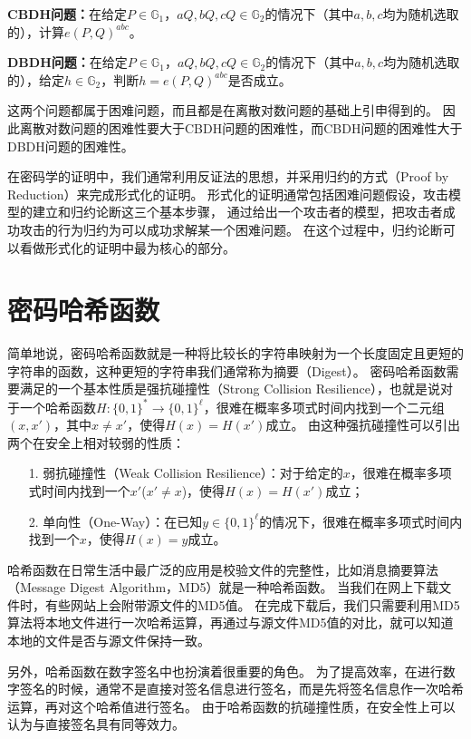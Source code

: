 \textbf{CBDH问题：}在给定$P\in\mathbb{G}_1$，$aQ,bQ,cQ\in\mathbb{G}_2$的情况下（其中$a,b,c$均为随机选取的），计算$e(P,Q)^{abc}$。

\textbf{DBDH问题：}在给定$P\in\mathbb{G}_1$，$aQ,bQ,cQ\in\mathbb{G}_2$的情况下（其中$a,b,c$均为随机选取的），给定$h\in\mathbb{G}_2$，判断$h=e(P,Q)^{abc}$是否成立。

这两个问题都属于困难问题，而且都是在离散对数问题的基础上引申得到的。
因此离散对数问题的困难性要大于CBDH问题的困难性，而CBDH问题的困难性大于DBDH问题的困难性。

在密码学的证明中，我们通常利用反证法的思想，并采用归约的方式（Proof by Reduction）来完成形式化的证明。
形式化的证明通常包括困难问题假设，攻击模型的建立和归约论断这三个基本步骤，
通过给出一个攻击者的模型，把攻击者成功攻击的行为归约为可以成功求解某一个困难问题。
在这个过程中，归约论断可以看做形式化的证明中最为核心的部分。

\section{密码哈希函数}

简单地说，密码哈希函数就是一种将比较长的字符串映射为一个长度固定且更短的字符串的函数，这种更短的字符串我们通常称为摘要（Digest）。
密码哈希函数需要满足的一个基本性质是强抗碰撞性（Strong Collision Resilience），也就是说对于一个哈希函数$H:\{0,1\}^*\rightarrow \{0,1\}^\ell$，很难在概率多项式时间内找到一个二元组$(x,x')$，其中$x\neq x'$，使得$H(x)=H(x')$成立。
由这种强抗碰撞性可以引出两个在安全上相对较弱的性质：

\begin{itemize}
  \item[1.] 弱抗碰撞性（Weak Collision Resilience）：对于给定的$x$，很难在概率多项式时间内找到一个$x'$($x'\neq x$)，使得$H(x)=H(x')$成立；
  \item[2.] 单向性（One-Way）：在已知$y\in \{0,1\}^\ell$的情况下，很难在概率多项式时间内找到一个$x$，使得$H(x)=y$成立。
\end{itemize}

哈希函数在日常生活中最广泛的应用是校验文件的完整性，比如消息摘要算法（Message Digest Algorithm，MD5）就是一种哈希函数。
当我们在网上下载文件时，有些网站上会附带源文件的MD5值。
在完成下载后，我们只需要利用MD5算法将本地文件进行一次哈希运算，再通过与源文件MD5值的对比，就可以知道本地的文件是否与源文件保持一致。

另外，哈希函数在数字签名中也扮演着很重要的角色。
为了提高效率，在进行数字签名的时候，通常不是直接对签名信息进行签名，而是先将签名信息作一次哈希运算，再对这个哈希值进行签名。
由于哈希函数的抗碰撞性质，在安全性上可以认为与直接签名具有同等效力。

